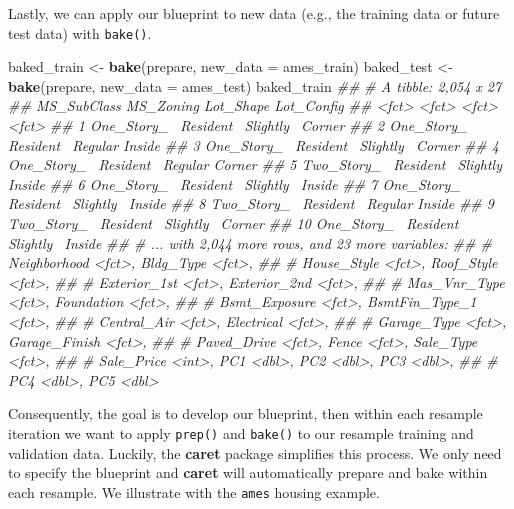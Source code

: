 \documentclass[]{krantz}
\makeatletter
\newenvironment{Shaded}{\begin{snugshade}}{\end{snugshade}}
\newcommand{\CommentTok}[1]{\textcolor[rgb]{0.37,0.37,0.37}{\textit{#1}}}
\newcommand{\DataTypeTok}[1]{\textcolor[rgb]{0.27,0.27,0.27}{#1}}
\newcommand{\KeywordTok}[1]{\textcolor[rgb]{0.27,0.27,0.27}{\textbf{#1}}}
\newcommand{\NormalTok}[1]{#1}
\newcommand{\StringTok}[1]{\textcolor[rgb]{0.5,0.5,0.5}{#1}}
\newenvironment{kframe}{%
\medskip{}
\setlength{\fboxsep}{.8em}
 \def\at@end@of@kframe{}%
 \ifinner\ifhmode%
  \def\at@end@of@kframe{\end{minipage}}%
  \begin{minipage}{\columnwidth}%
 \fi\fi%
 \def\FrameCommand##1{\hskip\@totalleftmargin \hskip-\fboxsep
 \colorbox{shadecolor}{##1}\hskip-\fboxsep
     \hskip-\linewidth \hskip-\@totalleftmargin \hskip\columnwidth}%
 \MakeFramed {\advance\hsize-\width
   \@totalleftmargin\z@ \linewidth\hsize
   \@setminipage}}%
 {\par\unskip\endMakeFramed%
 \at@end@of@kframe}
\renewenvironment{Shaded}{\begin{kframe}}{\end{kframe}}
\makeatother
\begin{document}
Lastly, we can apply our blueprint to new data (e.g., the training data or future test data) with \texttt{bake()}.

\begin{Shaded}
\begin{Highlighting}[]
\NormalTok{baked_train <-}\StringTok{ }\KeywordTok{bake}\NormalTok{(prepare, }\DataTypeTok{new_data =}\NormalTok{ ames_train)}
\NormalTok{baked_test <-}\StringTok{ }\KeywordTok{bake}\NormalTok{(prepare, }\DataTypeTok{new_data =}\NormalTok{ ames_test)}
\NormalTok{baked_train}
\CommentTok{## # A tibble: 2,054 x 27}
\CommentTok{##    MS_SubClass MS_Zoning Lot_Shape Lot_Config}
\CommentTok{##    <fct>       <fct>     <fct>     <fct>     }
\CommentTok{##  1 One_Story_~ Resident~ Slightly~ Corner    }
\CommentTok{##  2 One_Story_~ Resident~ Regular   Inside    }
\CommentTok{##  3 One_Story_~ Resident~ Slightly~ Corner    }
\CommentTok{##  4 One_Story_~ Resident~ Regular   Corner    }
\CommentTok{##  5 Two_Story_~ Resident~ Slightly~ Inside    }
\CommentTok{##  6 One_Story_~ Resident~ Slightly~ Inside    }
\CommentTok{##  7 One_Story_~ Resident~ Slightly~ Inside    }
\CommentTok{##  8 Two_Story_~ Resident~ Regular   Inside    }
\CommentTok{##  9 Two_Story_~ Resident~ Slightly~ Corner    }
\CommentTok{## 10 One_Story_~ Resident~ Slightly~ Inside    }
\CommentTok{## # ... with 2,044 more rows, and 23 more variables:}
\CommentTok{## #   Neighborhood <fct>, Bldg_Type <fct>,}
\CommentTok{## #   House_Style <fct>, Roof_Style <fct>,}
\CommentTok{## #   Exterior_1st <fct>, Exterior_2nd <fct>,}
\CommentTok{## #   Mas_Vnr_Type <fct>, Foundation <fct>,}
\CommentTok{## #   Bsmt_Exposure <fct>, BsmtFin_Type_1 <fct>,}
\CommentTok{## #   Central_Air <fct>, Electrical <fct>,}
\CommentTok{## #   Garage_Type <fct>, Garage_Finish <fct>,}
\CommentTok{## #   Paved_Drive <fct>, Fence <fct>, Sale_Type <fct>,}
\CommentTok{## #   Sale_Price <int>, PC1 <dbl>, PC2 <dbl>, PC3 <dbl>,}
\CommentTok{## #   PC4 <dbl>, PC5 <dbl>}
\end{Highlighting}
\end{Shaded}

Consequently, the goal is to develop our blueprint, then within each resample iteration we want to apply \texttt{prep()} and \texttt{bake()} to our resample training and validation data. Luckily, the \textbf{caret} package simplifies this process. We only need to specify the blueprint and \textbf{caret} will automatically prepare and bake within each resample. We illustrate with the \texttt{ames} housing example.
\end{document}
